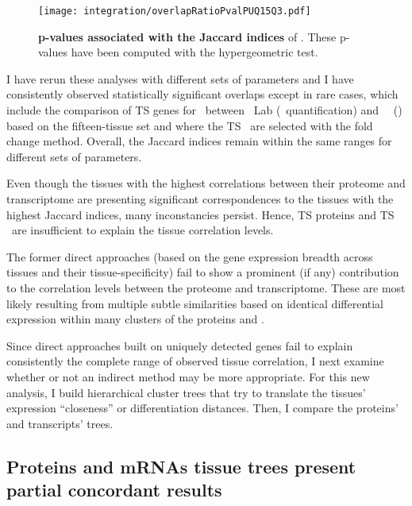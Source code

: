 \begin{figure}[!ht]
    \texttt{[image: integration/overlapRatioPvalPUQ15Q3.pdf]}\centering
    \vspace{-3mm}
    \caption[p-values associated with the Jaccard indices]{%
\label{fig:JaccardPvalues}\label{fig:pJacquard}%
    \textbf{p-values associated with the Jaccard indices} of .
    These p-values have been computed with the hypergeometric test.}
    \vspace{-3mm}
\end{figure}

I have rerun these analyses with different sets of parameters
and I have consistently observed statistically significant overlaps
except in rare cases,
which include the comparison of \gls{TS} genes for  \bladder\
between \pandey\ Lab (\PPKM\ quantification) and \uhlen\ \etal\ (\htseq)
based on the fifteen-tissue set and where the \gls{TS} \mRNAs\ are selected
with the fold change method.
Overall, the Jaccard indices remain within the same ranges
for different sets of parameters.

Even though the tissues with the highest correlations
between their proteome and transcriptome
are presenting significant correspondences
to the tissues with the highest Jaccard indices,
many inconstancies persist.
Hence, \gls{TS} proteins and \gls{TS} \mRNAs\ are insufficient to explain
the tissue correlation levels.

\vspace{-1.5mm}
The former direct approaches
(based on the gene expression breadth across tissues and their tissue-specificity)
fail to show a prominent (if any) contribution to the correlation levels
between the proteome and transcriptome.
These are most likely resulting
from multiple subtle similarities
based on identical differential expression
within many clusters of the proteins and \mRNAs{}.

\vspace{-1.5mm}
Since direct approaches built on uniquely detected genes
fail to explain consistently the complete range of observed tissue correlation,
I next examine whether or not an indirect method may be more appropriate.
For this new analysis,
I build hierarchical cluster trees that try to translate
the tissues' expression \enquote{closeness} or differentiation distances.
Then, I compare the proteins' and transcripts' trees.\mybr\

\subsection{Proteins and mRNAs tissue trees present partial concordant results\\}
\vspace{-12mm}

